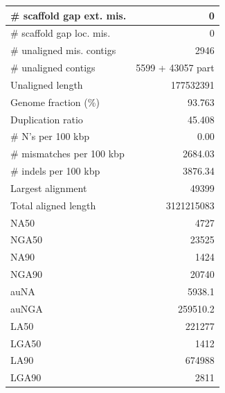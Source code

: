 \documentclass[12pt,a4paper]{article}
\begin{document}
\begin{table}[ht]
\begin{center}
\begin{tabular}{|l*{1}{|r}|}
\# scaffold gap ext. mis. & 0 \\ \hline
\# scaffold gap loc. mis. & 0 \\ \hline
\# unaligned mis. contigs & 2946 \\ \hline
\# unaligned contigs & 5599 + 43057 part \\ \hline
Unaligned length & 177532391 \\ \hline
Genome fraction (\%) & 93.763 \\ \hline
Duplication ratio & 45.408 \\ \hline
\# N's per 100 kbp & 0.00 \\ \hline
\# mismatches per 100 kbp & 2684.03 \\ \hline
\# indels per 100 kbp & 3876.34 \\ \hline
Largest alignment & 49399 \\ \hline
Total aligned length & 3121215083 \\ \hline
NA50 & 4727 \\ \hline
NGA50 & 23525 \\ \hline
NA90 & 1424 \\ \hline
NGA90 & 20740 \\ \hline
auNA & 5938.1 \\ \hline
auNGA & 259510.2 \\ \hline
LA50 & 221277 \\ \hline
LGA50 & 1412 \\ \hline
LA90 & 674988 \\ \hline
LGA90 & 2811 \\ \hline
\end{tabular}
\end{center}
\end{table}
\end{document}
